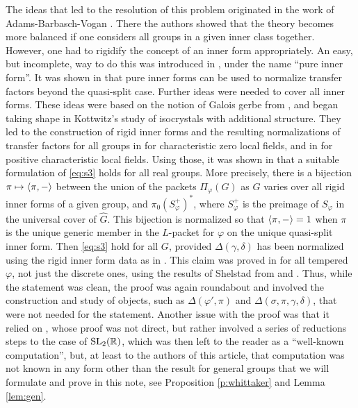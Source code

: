\documentclass{article}
\theoremstyle{definition}
\numberwithin{equation}{section}
\renewcommand{\-}{\hyp{}}
\begin{document}
The ideas that led to the resolution of this problem originated in the work of Adams-Barbasch-Vogan \cite{ABV92}. There the authors showed that the theory becomes more balanced if one considers all groups in a given inner class together. However, one had to rigidify the concept of an inner form appropriately. An easy, but incomplete, way to do this was introduced in \cite{Vog93}, under the name ``pure inner form''. It was shown in \cite[\S2.2]{KalECI} that pure inner forms can be used to normalize transfer factors beyond the quasi-split case. Further ideas were needed to cover all inner forms. These ideas were based on the notion of Galois gerbe from \cite{LR87}, and began taking shape in Kottwitz's study \cite{Kot97} of isocrystals with additional structure. They led to the construction of rigid inner forms and the resulting normalizations of transfer factors for all groups in \cite{KalRI} for characteristic zero local fields, and in \cite{Dillery20} for positive characteristic local fields. Using those, it was shown in \cite[\S5.6]{KalRI} that a suitable formulation of \eqref{eq:s3} holds for all real groups. More precisely, there is a bijection $\pi \mapsto \langle\pi,-\rangle$ between the union of the packets $\Pi_\varphi(G)$ as $G$ varies over all rigid inner forms of a given group, and $\pi_0(S_\varphi^+)^*$, where $S_\varphi^+$ is the preimage of $S_\varphi$ in the universal cover of $\hat G$. This bijection is normalized so that $\langle\pi,-\rangle=1$ when $\pi$ is the unique generic member in the $L$\-packet for $\varphi$ on the unique quasi-split inner form. Then \eqref{eq:s3} hold for all $G$, provided $\Delta(\gamma,\delta)$ has been normalized using the rigid inner form data as in \cite[\S5.3]{KalRI}. This claim was proved in \cite[\S5.6]{KalRI} for all tempered $\varphi$, not just the discrete ones, using the results of Shelstad from \cite{SheTE2} and \cite{SheTE3}. Thus, while the statement was clean, the proof was again roundabout and involved the construction and study of objects, such as $\Delta(\varphi',\pi)$ and $\Delta(\sigma,\pi,\gamma,\delta)$, that were not needed for the statement. Another issue with the proof was that it relied on \cite[Theorem 11.5]{SheTE3}, whose proof was not direct, but rather involved a series of reductions steps to the case of $\textrm{SL}_2(\mathbb{R})$, which was then left to the reader as a ``well-known computation'', but, at least to the authors of this article, that computation was not known in any form other than the result for general groups that we will formulate and prove in this note, see Proposition \ref{p:whittaker} and Lemma \ref{lem:gen}.
\end{document}
